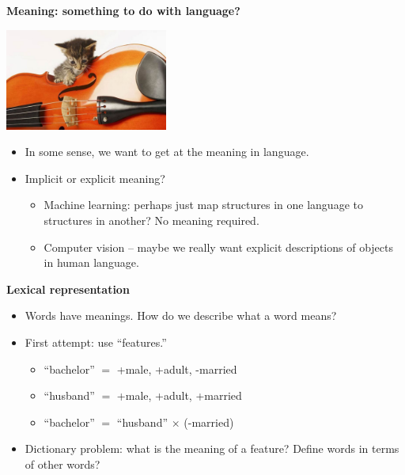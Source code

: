 \documentclass{beamer}
\newcommand{\pagestepalt}[2]{
  \begin{frame}[t]
    \begin{minipage}[t][0.26\textheight][t]{\textwidth}
      \begin{center}
        \huge
        \textbf{#1}
      \end{center}
    \end{minipage}
    
    \begin{minipage}[t][0.7\textheight][c]{\textwidth}
      #2
    \end{minipage}
  \end{frame}
}
\begin{document}
\pagestepalt{Meaning: something to do with language?}{
  \begin{center}
    \includegraphics[width=0.4\textwidth]{../images/kitten-violin.jpg}
  \end{center}\pause
  \begin{itemize}
  \item In some sense, we want to get at the meaning in language.\pause
  \item Implicit or explicit meaning?\pause
    \begin{itemize}
    \item Machine learning: perhaps just map structures in one language to structures in another? No meaning required.\pause
    \item Computer vision -- maybe we really want explicit descriptions of objects in human language.
    \end{itemize}
  \end{itemize}
}

\pagestepalt{Lexical representation}{
  \begin{itemize}
  \item Words have meanings.  How do we describe what a word means?\pause
  \item First attempt: use ``features.'' \pause
    \begin{itemize}
    \item ``bachelor'' $=$ +male, +adult, -married\pause
    \item ``husband'' $=$ +male, +adult, +married\pause
    \item ``bachelor'' $=$ ``husband'' $\times$ (-married)\pause
    \end{itemize}
  \item Dictionary problem: what is the meaning of a feature?  Define words in terms of other words?
  \end{itemize}
}
\end{document}
